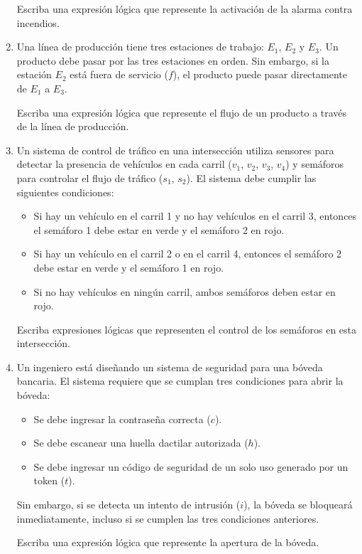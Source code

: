 \begin{enumerate}[label=\textbf{\arabic*}.]
	Escriba una expresión lógica que represente la activación de la alarma contra incendios.
	
	\item Una línea de producción tiene tres estaciones de trabajo: $E_1$, $E_2$ y $E_3$. Un producto debe pasar por las tres estaciones en orden. Sin embargo, si la estación $E_2$ está fuera de servicio ($f$), el producto puede pasar directamente de $E_1$ a $E_3$.
	
	Escriba una expresión lógica que represente el flujo de un producto a través de la línea de producción.
	
	\item Un sistema de control de tráfico en una intersección utiliza sensores para detectar la presencia de vehículos en cada carril ($v_1$, $v_2$, $v_3$, $v_4$) y semáforos para controlar el flujo de tráfico ($s_1$, $s_2$). El sistema debe cumplir las siguientes condiciones:
	\begin{itemize}[itemsep=-3pt]
		\item Si hay un vehículo en el carril 1 y no hay vehículos en el carril 3, entonces el semáforo 1 debe estar en verde y el semáforo 2 en rojo.
		\item Si hay un vehículo en el carril 2 o en el carril 4, entonces el semáforo 2 debe estar en verde y el semáforo 1 en rojo.
		\item Si no hay vehículos en ningún carril, ambos semáforos deben estar en rojo.
	\end{itemize}
	
	Escriba expresiones lógicas que representen el control de los semáforos en esta intersección.
	
	\item Un ingeniero está diseñando un sistema de seguridad para una bóveda bancaria. El sistema requiere que se cumplan tres condiciones para abrir la bóveda:
	
	\begin{itemize}[itemsep=-3pt]
		\item Se debe ingresar la contraseña correcta ($c$).
		\item Se debe escanear una huella dactilar autorizada ($h$).
		\item Se debe ingresar un código de seguridad de un solo uso generado por un token ($t$).
	\end{itemize}	
	Sin embargo, si se detecta un intento de intrusión ($i$), la bóveda se bloqueará inmediatamente, incluso si se cumplen las tres condiciones anteriores.
	
	Escriba una expresión lógica que represente la apertura de la bóveda.
\end{enumerate}

